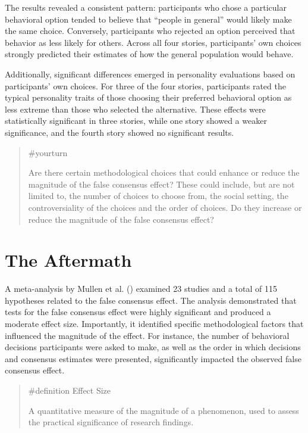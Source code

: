 \documentclass[
  letterpaper,
]{book}
\begin{document}
The results revealed a consistent pattern: participants who chose a
particular behavioral option tended to believe that ``people in
general'' would likely make the same choice. Conversely, participants
who rejected an option perceived that behavior as less likely for
others. Across all four stories, participants' own choices strongly
predicted their estimates of how the general population would behave.

Additionally, significant differences emerged in personality evaluations
based on participants' own choices. For three of the four stories,
participants rated the typical personality traits of those choosing
their preferred behavioral option as less extreme than those who
selected the alternative. These effects were statistically significant
in three stories, while one story showed a weaker significance, and the
fourth story showed no significant results.

\begin{quote}
{\#yourturn}

Are there certain methodological choices that could enhance or reduce
the magnitude of the false consensus effect? These could include, but
are not limited to, the number of choices to choose from, the social
setting, the controversiality of the choices and the order of choices.
Do they increase or reduce the magnitude of the false consensus effect?
\end{quote}

\section{The Aftermath}\label{the-aftermath-1}

A meta-analysis by Mullen et al.
() examined 23 studies and a total
of 115 hypotheses related to the false consensus effect. The analysis
demonstrated that tests for the false consensus effect were highly
significant and produced a moderate effect size. Importantly, it
identified specific methodological factors that influenced the magnitude
of the effect. For instance, the number of behavioral decisions
participants were asked to make, as well as the order in which decisions
and consensus estimates were presented, significantly impacted the
observed false consensus effect.

\begin{quote}
\label{def-effectsize}{\#definition} Effect Size

A quantitative measure of the magnitude of a phenomenon, used to assess
the practical significance of research findings.
\end{quote}
\end{document}

